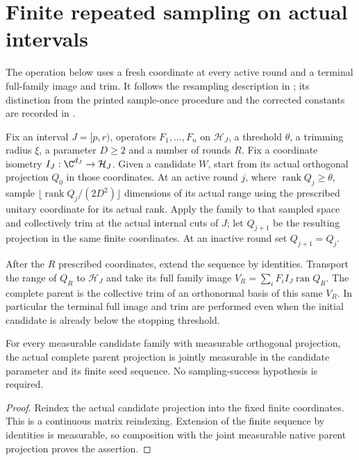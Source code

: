 \section{Finite repeated sampling on actual intervals}

The operation below uses a fresh coordinate at every active round and a
terminal full-family image and trim. It follows the resampling description
in \cite{Arad2016RigorousRG}; its distinction from the printed sample-once
procedure and the corrected constants are recorded in
\cite{gap:alvv16_bootstrap_constants}.

\begin{definition}
    \label{def:complete_interval_resampling_parent}
    \leanok
    Fix an interval $J=[p,r)$, operators $F_1,\ldots,F_n$ on
    $\mathcal H_J$, a threshold $\theta$, a trimming radius $\xi$, a
    parameter $D\ge2$ and a number of rounds $R$. Fix a coordinate isometry $I_J:\C^{d_J}\to\mathcal H_J$.
    Given a candidate $W$, start from its
    actual orthogonal projection $Q_0$ in those coordinates. At an active
    round $j$, where $\operatorname{rank}Q_j\ge\theta$, sample
    $\lfloor\operatorname{rank}Q_j/(2D^2)\rfloor$ dimensions of its actual
    range using the prescribed unitary coordinate for its actual rank. Apply the family
    to that sampled space and collectively trim at the actual internal
    cuts of $J$; let $Q_{j+1}$ be the resulting projection in the same
    finite coordinates. At an inactive round set $Q_{j+1}=Q_j$.

    After the $R$ prescribed coordinates, extend the sequence by identities.
    Transport the range of $Q_R$ to $\mathcal H_J$ and take its full family
    image $V_R=\sum_i F_i I_J\operatorname{ran}Q_R$. The complete parent is
    the collective trim of an orthonormal basis of this same $V_R$.
    In particular the terminal full image and trim are performed even
    when the initial candidate is already below the stopping threshold.
\end{definition}

\begin{lemma}
    \label{lem:complete_interval_resampling_parent_measurable}
    \leanok
    For every measurable candidate family with measurable orthogonal
    projection, the actual complete parent projection is jointly
    measurable in the candidate parameter and its finite seed sequence.
    No sampling-success hypothesis is required.
\end{lemma}
\begin{proof}\leanok
    Reindex the actual candidate projection into the fixed finite
    coordinates. This is a continuous matrix reindexing. Extension of the
    finite sequence by identities is measurable, so composition with the
    joint measurable native parent projection proves the assertion.
\end{proof}

